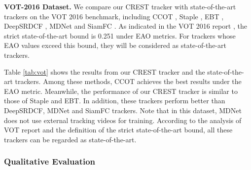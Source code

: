 \documentclass[10pt,twocolumn,letterpaper]{article}
\begin{document}
{\flushleft \bf VOT-2016 Dataset.}
We compare our CREST tracker with state-of-the-art trackers on the VOT 2016 benchmark, including CCOT \cite{martin-eccv16-beyond}, Staple \cite{bertinetto-cvpr16-staple}, EBT \cite{zhu-cvpr16-beyond}, DeepSRDCF \cite{Danelljan-iccvw15-DeepSRDCF}, MDNet \cite{nam-cvpr16-mdnet} and SiamFC \cite{bertinetto-eccv16-fully}. As indicated in the VOT 2016 report \cite{kristan-eccvw16-vot}, the strict state-of-the-art bound is 0.251 under EAO metrics. For trackers whose EAO values exceed this bound, they will be considered as state-of-the-art trackers.

Table \ref{tab:vot} shows the results from our CREST tracker and the state-of-the-art trackers. Among these methods, CCOT achieves the best results under the EAO metric. Meanwhile, the performance of our CREST tracker is similar to those of Staple and EBT. In addition, these trackers perform better than DeepSRDCF, MDNet and SiamFC trackers. Note that in this dataset, MDNet does not use external tracking videos for training. According to the analysis of VOT report and the definition of the strict state-of-the-art bound, all these trackers can be regarded as state-of-the-art.


\subsubsection{Qualitative Evaluation}
\end{document}
